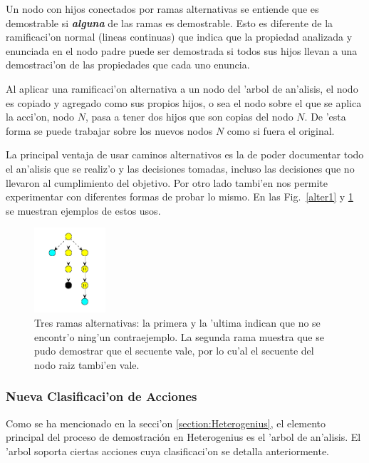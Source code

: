Un nodo con hijos conectados por ramas alternativas se entiende que es demostrable si \textit{\textbf{alguna}} de las ramas es demostrable. Esto es diferente de la ramificaci'on normal (lineas continuas) que indica que la propiedad analizada y enunciada en el nodo padre puede ser demostrada si todos sus hijos llevan a una demostraci'on de las propiedades que cada uno enuncia.

Al aplicar una ramificaci'on alternativa a un nodo del 'arbol de an'alisis, el nodo es copiado y agregado como sus propios hijos, o sea el nodo sobre el que se aplica la acci'on, nodo $N$, pasa a tener dos hijos que son copias del nodo $N$. De 'esta forma se puede trabajar sobre los nuevos nodos $N$ como si fuera el original.
 
La principal ventaja de usar caminos alternativos es la de poder documentar todo el an'alisis que se realiz'o y las decisiones tomadas, incluso las decisiones que no llevaron al cumplimiento del objetivo. Por otro lado tambi'en nos permite experimentar con diferentes formas de probar lo mismo.
En las Fig.~\ref{alter1} y \ref{alter2} se muestran ejemplos de estos usos.

\begin{figure}[]
	\includegraphics[width=100px]{img/ramas_alternativas.png}
	\centering
	\caption{Tres ramas alternativas: la primera y la 'ultima indican que no se encontr'o ning'un contraejemplo. La segunda rama muestra que se pudo demostrar que el secuente vale, por lo cu'al el secuente del nodo raiz tambi'en vale.}
        \label{alter2}
\end{figure}



\subsubsection{Nueva Clasificaci'on de Acciones}

Como se ha mencionado en la secci'on \ref{section:Heterogenius}, el elemento principal del proceso de demostración en Heterogenius es el 'arbol de an'alisis. El 'arbol soporta ciertas acciones cuya clasificaci'on se detalla anteriormente.

